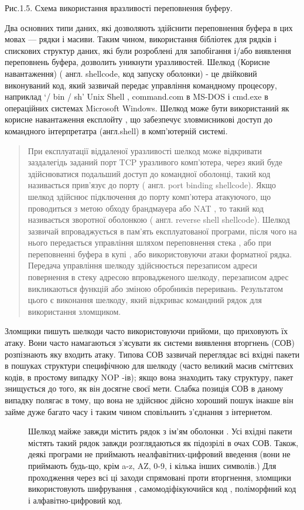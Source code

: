 \documentclass[oneside,final,14pt]{extreport}
\begin{document}
Рис.1.5. Схема використання вразливості переповнення буферу.

Два основних типи даних, які дозволяють здійснити переповнення буфера в цих мовах — рядки і масиви. Таким чином, використання бібліотек для рядків і спискових структур даних, які були розроблені для запобігання і/або виявлення переповнень буфера, дозволить уникнути уразливостей.
Шелкод (Корисне навантаження) ( англ. shellcode, код запуску оболонки) - це двійковий виконуваний код, який зазвичай передає управління командному процесору,  наприклад `/ bin / sh'  Unix Shell , command.com в MS-DOS і cmd.exe в операційних системах Microsoft Windows.  Шелкод може бути використаний як корисне навантаження експлойту , що забезпечує зловмисникові доступ до командного інтерпретатра (англ.shell) в комп'ютерній системі.
\begin{quote}

При експлуатації віддаленої уразливості шелкод може відкривати заздалегідь заданий порт TCP уразливого комп'ютера, через який буде здійснюватися подальший доступ до командної оболонці, такий код називається прив'язує до порту ( англ. port binding shellcode).  Якщо шелкод здійснює підключення до порту комп'ютера атакуючого, що проводиться з метою обходу брандмауера або NAT , то такий код називається зворотної оболонкою ( англ. reverse shell shellcode).
Шелкод зазвичай впроваджується в пам'ять експлуатованої програми, після чого на нього передається управління шляхом переповнення стека , або при переповненні буфера в купі , або використовуючи атаки форматної рядка.  Передача управління шелкоду здійснюється перезаписом адреси повернення в стеку адресою впровадженого шелкоду, перезаписом адрес викликаються функцій або зміною обробників переривань.  Результатом цього є виконання шелкоду, який відкриває командний рядок для використання зломщиком.
\end{quote}
\begin{description}
\item[{Зломщики пишуть шелкоди часто використовуючи прийоми, що приховують їх атаку.  Вони часто намагаються з'ясувати як системи виявлення вторгнень (СОВ) розпізнають яку входить атаку.  Типова СОВ зазвичай переглядає всі вхідні пакети в пошуках структури специфічною для шелкоду (часто великий масив сміттєвих кодів, в простому випадку NOP -ів); якщо вона знаходить таку структуру, пакет знищується до того, як він досягне своєї мети.  Слабка позиція СОВ в даному випадку полягає в тому, що вона не здійснює дійсно хороший пошук інакше він займе дуже багато часу і таким чином сповільнить з'єднання з інтернетом.}] \leavevmode
Шелкод майже завжди містить рядок з ім'ям оболонки .  Усі вхідні пакети містять такий рядок завжди розглядаються як підозрілі в очах СОВ.  Також, деякі програми не приймають неалфавітних-цифровий введення (вони не приймають будь-що, крім a-z, AZ, 0-9, і кілька інших символів.)
Для проходження через всі ці заходи спрямовані проти вторгнення, зломщики використовують шифрування , самомодіфікуючийся код , поліморфний код і алфавітно-цифровий код.

\end{description}
\end{document}
